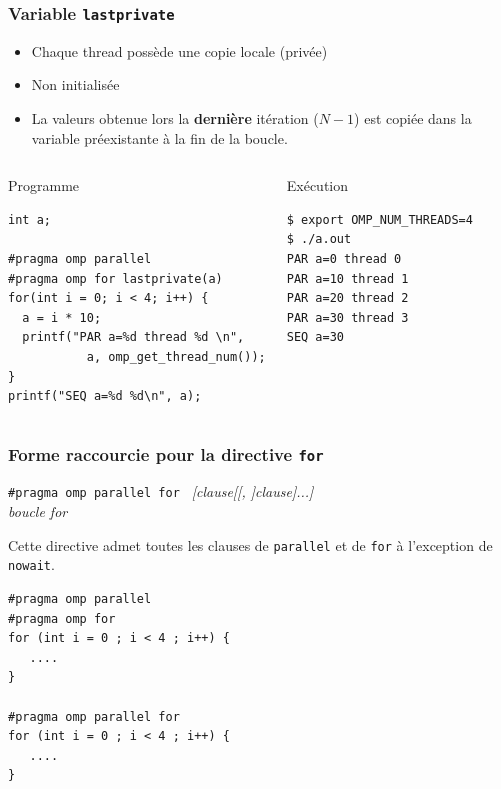 \documentclass{beamer}
\begin{document}
\begin{frame}[fragile]
  \frametitle{Variable {\tt lastprivate}}

  \begin{itemize}
  \item Chaque thread possède une copie locale (privée)
  \item \alert{Non initialisée}
  \item La valeurs obtenue lors la \textbf{dernière} itération ($N-1$)
    est copiée dans la variable préexistante à la fin de la boucle.
  \end{itemize}

  \begin{columns}[t]
  \column{5.5cm}
  \begin{block}{Programme}
\begin{verbatim}
int a;
  
#pragma omp parallel 
#pragma omp for lastprivate(a)
for(int i = 0; i < 4; i++) {
  a = i * 10;
  printf("PAR a=%d thread %d \n",
           a, omp_get_thread_num());
}
printf("SEQ a=%d %d\n", a);
\end{verbatim}
\end{block}
  
  \column{5cm}
  
  \begin{block}{Exécution}
    \small
\begin{verbatim}
$ export OMP_NUM_THREADS=4
$ ./a.out 
PAR a=0 thread 0
PAR a=10 thread 1
PAR a=20 thread 2
PAR a=30 thread 3
SEQ a=30
\end{verbatim}
  \end{block}  
\end{columns}


\normalsize
\end{frame}


\begin{frame}[fragile]
  \frametitle{Forme raccourcie pour la directive {\tt for}}
  
\begin{framed}
  {\tt \#pragma omp parallel for } {\it  [clause[[, ]clause]...]}  \\
  {\it boucle for} 
\end{framed}

Cette directive admet toutes les clauses de {\tt parallel} et de {\tt for} à
l'exception de {\tt nowait}. 

\medskip

\begin{verbatim}
#pragma omp parallel
#pragma omp for
for (int i = 0 ; i < 4 ; i++) {
   ....
}

#pragma omp parallel for
for (int i = 0 ; i < 4 ; i++) {
   ....
}
\end{verbatim}
\end{frame}
\end{document}
